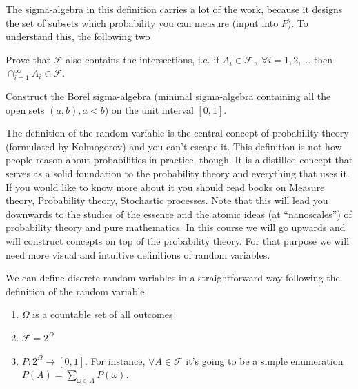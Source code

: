 The sigma-algebra in this definition carries a lot of the work, because it designs the set of subsets which probability you can measure (input into $P$). 
To understand this, the following two 
\begin{exercise}
    Prove that $\mathcal{F}$ also contains the intersections, i.e. if $A_i \in \mathcal{F}\,, \; \forall i = 1,2,\ldots$ then $\cap_{i=1}^\infty A_i \in \mathcal{F}$.
\end{exercise}
\begin{exercise}
    Construct the Borel sigma-algebra (minimal sigma-algebra containing all the open sets $(a,b), a < b$) on the unit interval $[0,1]$.
\end{exercise}

The definition of the random variable is the central concept of probability theory (formulated by Kolmogorov) and you can't escape it.
This definition is not how people reason about probabilities in practice, though.
It is a distilled concept that serves as a solid foundation to the probability theory and everything that uses it. 
If you would like to know more about it you should read books on Measure theory, Probability theory, Stochastic processes.
Note that this will lead you downwards to the studies of the essence and the atomic ideas (at ``nanoscales'') of probability theory and pure mathematics.
In this course we will go upwards and will construct concepts on top of the probability theory.
For that purpose we will need more visual and intuitive definitions of random variables.

\begin{mybox}
\begin{definition}
\label{def:discrete_rv}    
    We can define discrete random variables in a straightforward way following the definition of the random variable
    \begin{enumerate}
        \item $\Omega$ is a countable set of all outcomes 
        \item $\mathcal{F} = 2^\Omega$ 
        \item $P: 2^\Omega \to [0,1]$. For instance, $\forall A \in \mathcal{F}$ it's going to be a simple enumeration $P(A) = \sum_{\omega \in A} P(\omega)$. 
    \end{enumerate}
\end{definition}
\end{mybox}

